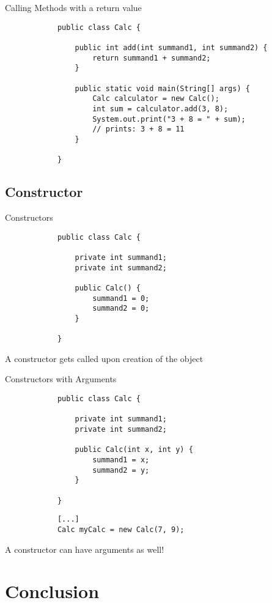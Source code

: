 	\begin{frame}[fragile]{Calling Methods with a return value}
		\begin{lstlisting}
			public class Calc {
				
				public int add(int summand1, int summand2) {
					return summand1 + summand2;
				}
				
				public static void main(String[] args) {
					Calc calculator = new Calc();
					int sum = calculator.add(3, 8);
					System.out.print("3 + 8 = " + sum); 
					// prints: 3 + 8 = 11
				}
				
			}
		\end{lstlisting}
	\end{frame}
	
	\subsection{Constructor}
	
	\begin{frame}[fragile]{Constructors}
		\begin{lstlisting}
			public class Calc {
				
				private int summand1;
				private int summand2;
				
				public Calc() {
					summand1 = 0;
					summand2 = 0;
				}
				
			}
		\end{lstlisting}
		A constructor gets called upon creation of the object
	\end{frame}
	
	\begin{frame}[fragile]{Constructors with Arguments}
		\begin{lstlisting}
			public class Calc {
				
				private int summand1;
				private int summand2;
				
				public Calc(int x, int y) {
					summand1 = x;
					summand2 = y;
				}
				
			}
		\end{lstlisting}
		\begin{lstlisting}
			[...]
			Calc myCalc = new Calc(7, 9);
		\end{lstlisting}
		
		A constructor can have arguments as well!
	\end{frame}
	
	\section{Conclusion}
